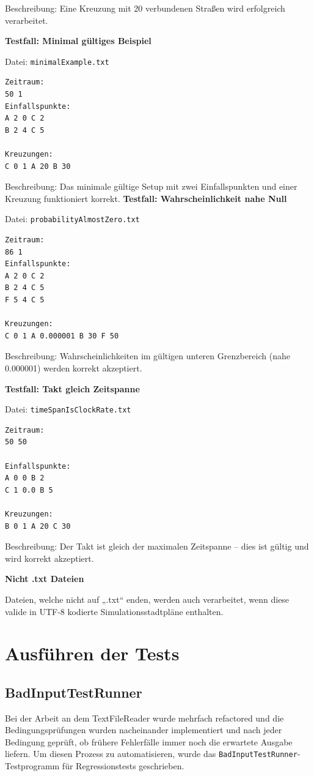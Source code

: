 Beschreibung: Eine Kreuzung mit 20 verbundenen Straßen wird erfolgreich verarbeitet.

\textbf{Testfall: Minimal gültiges Beispiel}

Datei: \texttt{minimalExample.txt}
\begin{lstlisting}
Zeitraum:
50 1
Einfallspunkte:
A 2 0 C 2
B 2 4 C 5

Kreuzungen:
C 0 1 A 20 B 30
\end{lstlisting}

Beschreibung: Das minimale gültige Setup mit zwei Einfallspunkten und einer Kreuzung funktioniert korrekt.
\clearpage
\textbf{Testfall: Wahrscheinlichkeit nahe Null}

Datei: \texttt{probabilityAlmostZero.txt}
\begin{lstlisting}
Zeitraum:
86 1
Einfallspunkte:
A 2 0 C 2
B 2 4 C 5
F 5 4 C 5

Kreuzungen:
C 0 1 A 0.000001 B 30 F 50
\end{lstlisting}

Beschreibung: Wahrscheinlichkeiten im gültigen unteren Grenzbereich (nahe 0.000001) werden korrekt akzeptiert.

\textbf{Testfall: Takt gleich Zeitspanne}

Datei: \texttt{timeSpanIsClockRate.txt}
\begin{lstlisting}
Zeitraum:
50 50

Einfallspunkte:
A 0 0 B 2
C 1 0.0 B 5

Kreuzungen:
B 0 1 A 20 C 30
\end{lstlisting}

Beschreibung: Der Takt ist gleich der maximalen Zeitspanne – dies ist gültig und wird korrekt akzeptiert.

\textbf{Nicht .txt Dateien}

Dateien, welche nicht auf „.txt“ enden, werden auch verarbeitet, wenn diese valide in UTF-8 kodierte Simulationsstadtpläne enthalten.

\section{Ausführen der Tests}

\subsection{BadInputTestRunner}

Bei der Arbeit an dem TextFileReader wurde mehrfach refactored und die Bedingungsprüfungen wurden nacheinander implementiert und nach jeder Bedingung geprüft, 
ob frühere Fehlerfälle immer noch die erwartete Ausgabe liefern. 
Um diesen Prozess zu automatisieren, wurde das \texttt{BadInputTestRunner}-Testprogramm für Regressionstests geschrieben.

